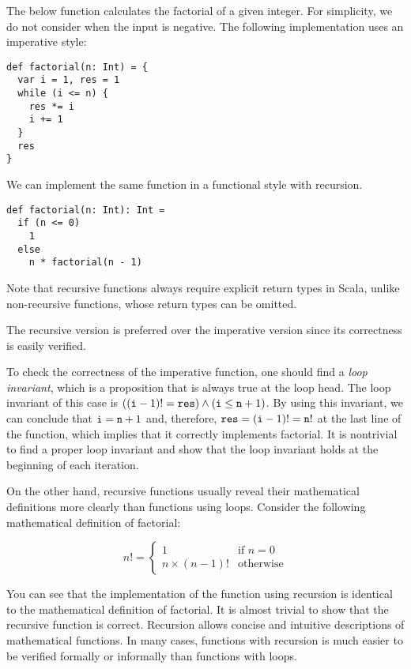 The below  function calculates the factorial of a given integer.
For simplicity, we do not consider when the input is negative.
The following implementation uses an imperative style:

\begin{verbatim}
def factorial(n: Int) = {
  var i = 1, res = 1
  while (i <= n) {
    res *= i
    i += 1
  }
  res
}
\end{verbatim}

We can implement the same function in a functional style with recursion.

\begin{verbatim}
def factorial(n: Int): Int =
  if (n <= 0)
    1
  else
    n * factorial(n - 1)
\end{verbatim}

Note that recursive functions always require explicit return types in Scala,
unlike non-recursive functions, whose return types can be omitted.

The recursive version is preferred over the imperative version since its
correctness is easily verified.

To check the correctness of the imperative
 function, one should find a \textit{loop invariant},
which is a proposition that is always true at the loop head.
The loop invariant of this case is
$((\texttt{i}-1)!=\texttt{res})\land(\texttt{i}\le\texttt{n}+1)$.
By using this invariant, we can conclude that $\texttt{i}=\texttt{n}+1$ and,
therefore, $\texttt{res}=(\texttt{i}-1)!=\texttt{n}!$ at the last line of the
function, which implies that it correctly implements factorial.
It is nontrivial to find a proper loop invariant and show that the loop invariant
holds at the beginning of each iteration.

On the other hand,
recursive functions usually reveal their mathematical definitions more clearly
than functions using loops. Consider the following mathematical definition of
factorial:

\[n!=\begin{cases}1 & \text{if } n=0\\n \times (n-1)! &
\text{otherwise}\end{cases}\]

You can see that the implementation of the  function using recursion
is identical to the mathematical definition of factorial. It is almost trivial
to show that the recursive  function is correct.
Recursion allows concise and intuitive descriptions of mathematical functions.
In many cases, functions with recursion is much easier to be verified formally
or informally than functions with loops.

